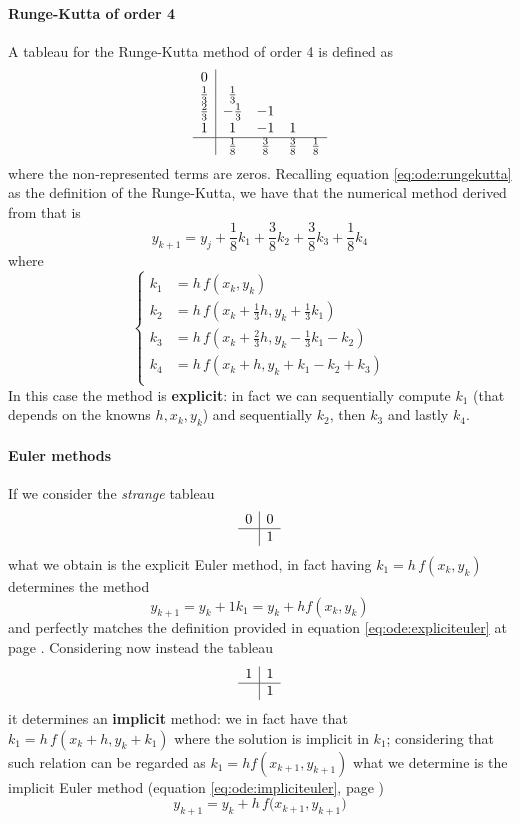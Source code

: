 		\paragraph{Runge-Kutta of order 4} A tableau for the Runge-Kutta method of order 4 is defined as
		\[ \begin{array}{c | c c c c}
			0 &  \\
			\frac 1 3 & \frac 1 3 & \\
			\frac 2 3 & - \frac 1 3 & - 1 \\
			1 & 1 & -1  & 1 \\ \hline
			& \frac 1 8 &  \frac 3 8 & \frac 3 8 & \frac 1 8
		\end{array} \]
		where the non-represented terms are zeros. Recalling equation \ref{eq:ode:rungekutta} as the definition of the Runge-Kutta, we have that the numerical method derived from that is
		\[ y_{k+1} = y_j + \frac 1 8 k_1 + \frac 3 8 k_2 + \frac 3 8 k_3 + \frac 1 8 k_4 \]
		where
		\[ \begin{cases}
			k_1 & = h\, f(x_k,y_k) \\
			k_2 & = h\, f\left( x_k + \frac 1 3 h, y_k + \frac 1 3 k_1 \right) \\
			k_3 & = h\, f\left( x_k + \frac 2 3 h, y_k - \frac 1 3 k_1 - k_2\right) \\
			k_4 & = h\, f\left( x_k + h, y_k + k_1 - k_2 + k_3 \right) \\
		\end{cases}\]
		In this case the method is \textbf{explicit}: in fact we can sequentially compute $k_1$ (that depends on the knowns $h,x_k,y_k$) and sequentially $k_2$, then $k_3$ and lastly $k_4$.	
	
		\paragraph{Euler methods} If we consider the \textit{strange} tableau 
		\[ \begin{array} {c |c}
			0 & 0 \\ \hline & 1
		\end{array} \]
		what we obtain is the explicit Euler method, in fact having $k_1 = h\, f(x_k,y_k)$ determines the method
		\[ y_{k+1} = y_k + 1 k_1 = y_k + h f(x_k,y_k) \]
		and perfectly matches the definition provided in equation \ref{eq:ode:expliciteuler} at page \pageref{eq:ode:expliciteuler}. Considering now instead the tableau
		\[ \begin{array} {c |c}
			1 & 1 \\ \hline & 1
		\end{array} \]
		it determines an \textbf{implicit} method: we in fact have that $k_1 = h\, f(x_k + h, y_k + k_1)$ where the solution is implicit in $k_1$; considering that such relation can be regarded as $k_1 = h f(x_{k+1}, y_{k+1})$ what we determine is the implicit Euler method (equation \ref{eq:ode:impliciteuler}, page \pageref{eq:ode:impliciteuler})
		\[ y_{k+1} = y_k + h \, f\big(x_{k+1}, y_{k+1}\big) \]
		

